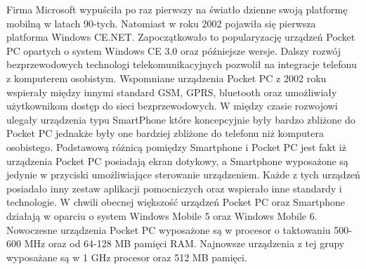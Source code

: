 Firma Microsoft wypuściła po raz pierwszy na światło dzienne swoją platformę
mobilną w latach 90-tych\cite{blog:wm-app-dev}. Natomiast w roku 2002 pojawiła
się pierwsza platforma Windows CE.NET. Zapoczątkowało to popularyzację urządzeń Pocket PC opartych o
system Windows CE 3.0 oraz późniejsze wersje. Dalszy rozwój bezprzewodowych
technologi telekomunikacyjnych pozwolił na integracje telefonu z komputerem
osobistym. Wspomniane urządzenia Pocket PC z 2002 roku wspierały między innymi
standard GSM, GPRS, bluetooth oraz umożliwiały użytkownikom dostęp do sieci
bezprzewodowych. W między czasie rozwojowi ulegały urządzenia typu SmartPhone
które koncepcyjnie były bardzo zbliżone do Pocket PC jednakże były one bardziej
zbliżone do telefonu niż komputera osobistego. Podstawową różnicą pomiędzy
Smartphone i Pocket PC jest fakt iż urządzenia Pocket PC posiadają ekran
dotykowy, a Smartphone wyposażone są jedynie w przyciski umożliwiające sterowanie
urządzeniem. Każde z tych urządzeń posiadało inny zestaw aplikacji pomocniczych
oraz wspierało inne standardy i technologie.
\newpage
W chwili obecnej większość urządzeń Pocket PC oraz Smartphone działają w oparciu
o system Windows Mobile 5 oraz Windows Mobile 6. Nowoczesne urządzenia Pocket PC
wyposażone są w procesor o taktowaniu 500-600 MHz oraz od 64-128 MB pamięci RAM.
Najnowsze urządzenia z tej grupy wyposażane są w 1 GHz procesor oraz 512 MB
pamięci.
 

